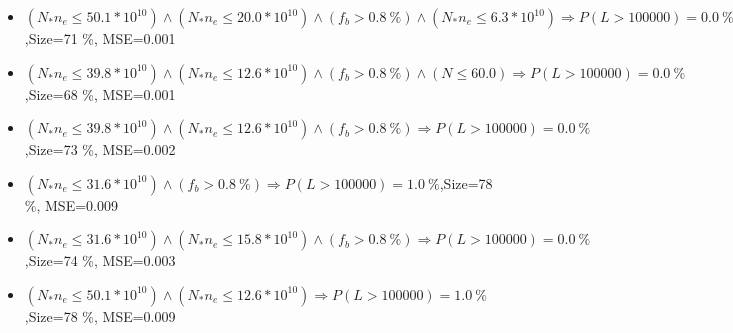\documentclass[numbered]{CSL}
\begin{document}
\begin{itemize}
\item $(N_* n_e \leq 50.1 * 10^{10}) \land (N_* n_e \leq 20.0 * 10^{10}) \land (f_b > 0.8~\%) \land (N_* n_e \leq 6.3 * 10^{10}) \Rightarrow P(L > 100 000) = 0.0~\%$,\hfill Size=71 \%, MSE=0.001
\item $(N_* n_e \leq 39.8 * 10^{10}) \land (N_* n_e \leq 12.6 * 10^{10}) \land (f_b > 0.8~\%) \land (N \leq 60.0) \Rightarrow P(L > 100 000) = 0.0~\%$,\hfill Size=68 \%, MSE=0.001
\item $(N_* n_e \leq 39.8 * 10^{10}) \land (N_* n_e \leq 12.6 * 10^{10}) \land (f_b > 0.8~\%) \Rightarrow P(L > 100 000) = 0.0~\%$,\hfill Size=73 \%, MSE=0.002
\item $(N_* n_e \leq 31.6 * 10^{10}) \land (f_b > 0.8~\%) \Rightarrow P(L > 100 000) = 1.0~\%$,\hfill Size=78 \%, MSE=0.009
\item $(N_* n_e \leq 31.6 * 10^{10}) \land (N_* n_e \leq 15.8 * 10^{10}) \land (f_b > 0.8~\%) \Rightarrow P(L > 100 000) = 0.0~\%$,\hfill Size=74 \%, MSE=0.003
\item $(N_* n_e \leq 50.1 * 10^{10}) \land (N_* n_e \leq 12.6 * 10^{10}) \Rightarrow P(L > 100 000) = 1.0~\%$,\hfill Size=78 \%, MSE=0.009
\end{itemize}
\end{document}

